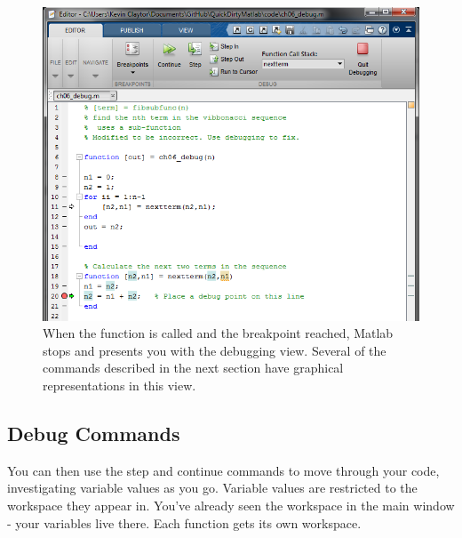 \pagebreak
\begin{figure}[ht!]
\centering
\includegraphics[width=120mm]{img/debug2.png}
\caption{When the function is called and the breakpoint reached, Matlab stops and presents you with the debugging view. Several of the commands described in the next section have graphical representations in this view.}
\label{guiload}
\end{figure}

\pagebreak
\subsection{Debug Commands}
\label{subsec:debugfile}
You can then use the step and continue commands to move through your code, investigating variable values as you go.
 Variable values are restricted to the workspace they appear in.
 You've already seen the workspace in the main window - your variables live there.
 Each function gets its own workspace.

